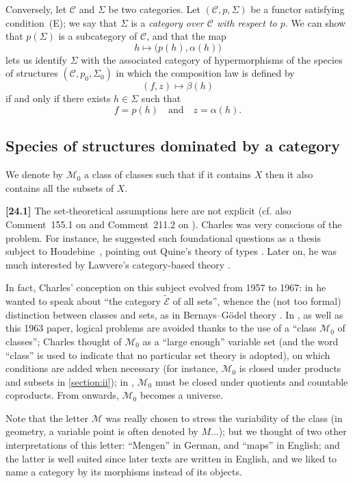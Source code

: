 \documentclass[a4paper,fleqn]{article}
\theoremstyle{plain}
\theoremstyle{definition}
\newenvironment{longcomm}[1]
  {\noindent\textbf{[#1]}\rmfamily}
  {}
\newcommand{\textand}{\quad\text{and}\quad}
\newcommand{\CC}{\mathcal{C}}
\newcommand{\MM}{\mathcal{M}}
\begin{document}
Conversely, let $\CC$ and $\Sigma$ be two categories.
Let $(\CC,p,\Sigma)$ be a functor satisfying condition~(E);
we say that $\Sigma$ is a \emph{category over $\CC$ with respect to $p$}.
We can show \cite{3a} that $p(\Sigma)$ is a subcategory of $\CC$, and that the map
\[
  h\longmapsto \big(p(h),\alpha(h)\big)
\]
lets us identify $\Sigma$ with the associated category of hypermorphisms of the species of structures $(\CC,p_0,\Sigma_0)$ in which the composition law is defined by
\[
  (f,z) \longmapsto \beta(h)
\]
if and only if there exists $h\in\Sigma$ such that
\[
  f=p(h)
  \textand
  z=\alpha(h).
\]



\subsection{Species of structures dominated by a category}
\label{section:i.3}

We denote by $\MM_0$ a class of classes such that if it contains $X$ then it also contains all the subsets of $X$.

\begin{longcomm}{24.1}
  The set-theoretical assumptions here are not explicit (cf. also Comment~155.1 on \cite{coll66} and Comment~211.2 on \cite{coll100}).
  Charles was very conscious of the problem.
  For instance, he suggested such foundational questions as a thesis subject to Houdebine~\cite{comm55}, pointing out Quine's theory of types \cite{comm87}.
  Later on, he was much interested by Lawvere's category-based theory \cite{comm64}.

  In fact, Charles' conception on this subject evolved from 1957 to 1967: in \cite{coll47} he wanted to speak about ``the category $\widetilde{\mathcal{E}}$ of all sets'', whence the (not too formal) distinction between classes and sets, as in Bernays--Gödel theory \cite{comm10}.
  In \cite{coll55}, as well as this 1963 paper, logical problems are avoided thanks to the use of a ``class $\MM_0$ of classes'';
  Charles thought of $\MM_0$ as a ``large enough'' variable set (and the word ``class'' is used to indicate that no particular set theory is adopted), on which conditions are added when necessary (for instance, $\MM_0$ is closed under products and subsets in \cref{section:ii});
  in \cite{coll66,coll100}, $\MM_0$ must be closed under quotients and countable coproducts.
  From \cite{coll109} onwards, $\MM_0$ becomes a universe.

  Note that the letter $\MM$ was really chosen to stress the variability of the class (in geometry, a variable point is often denoted by $M$...);
  but we thought of two other interpretations of this letter: ``Mengen'' in German, and ``maps'' in English;
  and the latter is well suited since later texts are written in English, and we liked to name a category by its morphisms instead of its objects.
\end{longcomm}
\end{document}
